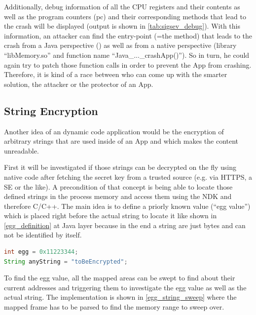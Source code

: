 Additionally, debug information of all the CPU registers and their contents as well as the program counters (pc) and their corresponding methods that lead to the crash will be displayed (output is shown in
\autoref{tab:sigsev_debug}). With this information, an attacker can find
the entry-point (=the method) that leads to the crash from a Java perspective
() as well as from a native perspective
(library ``libMemory.so'' and function name ``Java\_...\_crashApp()'').
So in turn, he could again try to patch
those function calls in order to prevent the App from crashing.
Therefore, it is kind of a race between who can come up with the smarter solution, the attacker or the protector of an App.

\subsection{String Encryption}\label{section:string_encryption}
Another idea of an dynamic code application would be the encryption of
arbitrary strings that are used inside of an App and which makes the content unreadable.

First it will be investigated if those strings can be decrypted on the
fly using native code after fetching the secret key from a trusted source
(e.g. via HTTPS, a SE or the like).
A precondition of that concept is being able to locate those defined strings
in the process memory and access them using the NDK and therefore C/C++.
The main idea is to define a priorly known value (``egg value'') which is placed right before the actual string to locate it like shown in \autoref{egg_definition} at Java
layer because in the end a string are just bytes and can not be identified by
itself.
\begin{lstlisting}[language=Java, caption=Egg Value Defining, label=egg_definition]
int egg = 0x11223344;
String anyString = "toBeEncrypted";
\end{lstlisting}
To find the egg value, all the mapped areas can be swept to find
about their current addresses and triggering them to investigate
the egg value as well as the actual string. The implementation is
shown in \autoref{egg_string_sweep} where the mapped frame has to be
parsed to find the memory range to sweep over.

